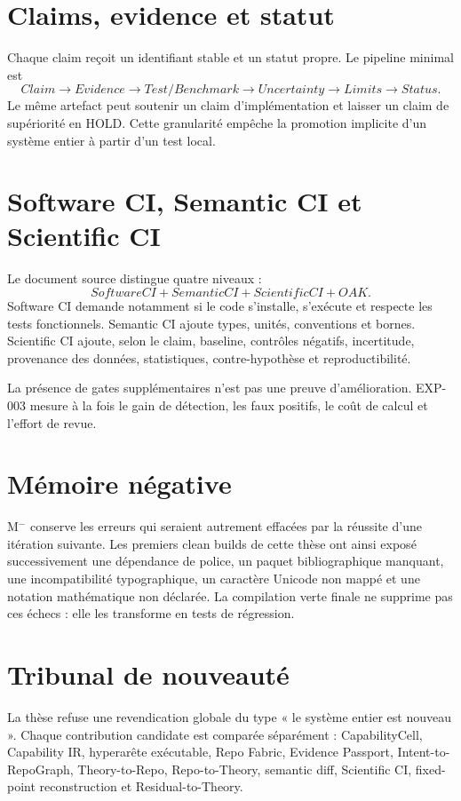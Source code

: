 \section{Claims, evidence et statut}

Chaque claim reçoit un identifiant stable et un statut propre. Le pipeline minimal est
\[
Claim\rightarrow Evidence\rightarrow Test/Benchmark\rightarrow Uncertainty\rightarrow Limits\rightarrow Status.
\]
Le même artefact peut soutenir un claim d'implémentation et laisser un claim de supériorité en HOLD. Cette granularité empêche la promotion implicite d'un système entier à partir d'un test local.

\section{Software CI, Semantic CI et Scientific CI}

Le document source distingue quatre niveaux :
\[
SoftwareCI+SemanticCI+ScientificCI+OAK.
\]
Software CI demande notamment si le code s'installe, s'exécute et respecte les tests fonctionnels. Semantic CI ajoute types, unités, conventions et bornes. Scientific CI ajoute, selon le claim, baseline, contrôles négatifs, incertitude, provenance des données, statistiques, contre-hypothèse et reproductibilité.

La présence de gates supplémentaires n'est pas une preuve d'amélioration. EXP-003 mesure à la fois le gain de détection, les faux positifs, le coût de calcul et l'effort de revue.

\section{Mémoire négative}

M$^-$ conserve les erreurs qui seraient autrement effacées par la réussite d'une itération suivante. Les premiers clean builds de cette thèse ont ainsi exposé successivement une dépendance de police, un paquet bibliographique manquant, une incompatibilité typographique, un caractère Unicode non mappé et une notation mathématique non déclarée. La compilation verte finale ne supprime pas ces échecs : elle les transforme en tests de régression.

\section{Tribunal de nouveauté}

La thèse refuse une revendication globale du type « le système entier est nouveau ». Chaque contribution candidate est comparée séparément : CapabilityCell, Capability IR, hyperarête exécutable, Repo Fabric, Evidence Passport, Intent-to-RepoGraph, Theory-to-Repo, Repo-to-Theory, semantic diff, Scientific CI, fixed-point reconstruction et Residual-to-Theory.

